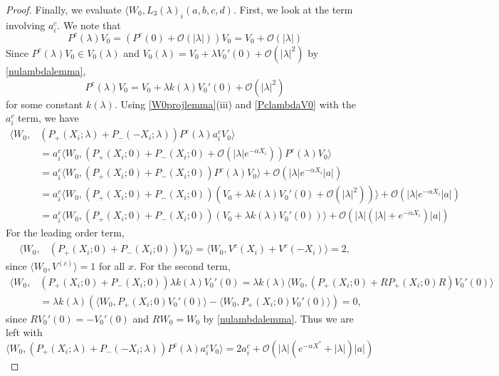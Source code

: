\documentclass[thesis.tex]{subfiles}
\begin{document}
\begin{lemma}
\begin{proof}
Finally, we evaluate $\langle W_0, L_3(\lambda)_i(a,b,c,d)$. First, we look at the term involving $a_i^c$. We note that 
\[
P^c(\lambda) V_0 = (P^c(0) + \mathcal{O}(|\lambda|)) V_0 = V_0 + \mathcal{O}(|\lambda|)
\]
Since $P^c(\lambda) V_0 \in V_0(\lambda)$ and $V_0(\lambda) = V_0 + \lambda V_0'(0) + \mathcal{O}(|\lambda|^2)$ by \cref{nulambdalemma}, 
\begin{equation}\label{PclambdaV0}
P^c(\lambda) V_0 = V_0 + \lambda k(\lambda) V_0'(0) + \mathcal{O}(|\lambda|^2)
\end{equation}
for some constant $k(\lambda)$. Using \cref{W0projlemma}(iii) and \cref{PclambdaV0} with the $a_i^c$ term, we have
\begin{align*}
\langle W_0, &(P_+(X_i; \lambda) +  P_-(-X_i; \lambda)) P^c(\lambda) a_i^c V_0 \rangle \\
&= a_i^c \langle W_0, (P_+(X_i; 0) + P_-(X_i; 0) + \mathcal{O}(|\lambda|e^{-\alpha X_i}))P^c(\lambda)V_0  \rangle \\
&= a_i^c \langle W_0, (P_+(X_i; 0) + P_-(X_i; 0))P^c(\lambda)V_0  \rangle + \mathcal{O}(|\lambda|e^{-\alpha X_i}|a|) \\
&= a_i^c \langle W_0, (P_+(X_i; 0) + P_-(X_i; 0))(V_0 + \lambda k(\lambda) V_0'(0) + \mathcal{O}(|\lambda|^2))  \rangle + \mathcal{O}(|\lambda|e^{-\alpha X_i}|a|) \\
&= a_i^c \langle W_0, (P_+(X_i; 0) + P_-(X_i; 0))(V_0 + \lambda k(\lambda) V_0'(0) )  \rangle + \mathcal{O}(|\lambda|(|\lambda| + e^{-\alpha X_i})|a|)
\end{align*}
For the leading order term, 
\begin{align*}
\langle W_0, &(P_+(X_i; 0) + P_-(X_i; 0)) V_0 \rangle
= \langle W_0, V^c(X_i) + V^c(-X_i) \rangle = 2,
\end{align*}
since $\langle W_0, V^(c)\rangle = 1$ for all $x$. For the second term,
\begin{align*}
\langle W_0, &(P_+(X_i; 0) + P_-(X_i; 0)) \lambda k(\lambda) V_0'(0) = 
\lambda k(\lambda) \langle W_0, (P_+(X_i; 0) + R P_+(X_i; 0) R ) V_0'(0)\rangle \\
&= \lambda k(\lambda) \left( \langle W_0, P_+(X_i; 0) V_0'(0) \rangle - \langle W_0, P_+(X_i; 0) V_0'(0) \rangle \right) = 0,
\end{align*}
since $R V_0'(0) = -V_0'(0)$ and $R W_0 = W_0$ by \cref{nulambdalemma}. Thus we are left with 
\begin{equation}\label{eqforaic}
\langle W_0, (P_+(X_i; \lambda) +  P_-(-X_i; \lambda)) P^c(\lambda) a_i^c V_0 \rangle
= 2 a_i^c + \mathcal{O}(|\lambda|( e^{-\alpha X^*} + |\lambda|)|a|)
\end{equation}


\end{proof}
\end{lemma}
\end{document}
